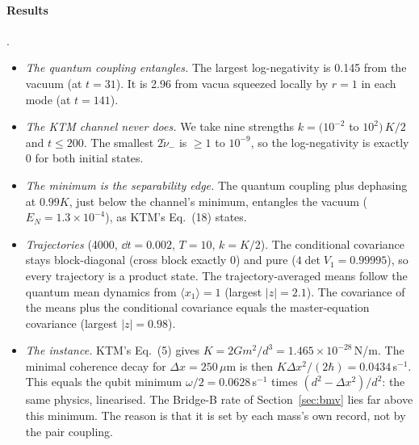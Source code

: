\paragraph{Results} .
\begin{itemize}[nosep]
\item \emph{The quantum coupling entangles.} The largest log-negativity is 0.145 from the vacuum (at $t=31$). It is 2.96 from vacua squeezed
locally by $r=1$ in each mode (at $t=141$).
\item \emph{The KTM channel never does.} We take nine strengths $k=(10^{-2}$ to $10^2)\,K/2$ and $t\le200$. The smallest $2\tilde\nu_-$ is
$\ge1$ to $10^{-9}$, so the log-negativity is exactly 0 for both initial states.
\item \emph{The minimum is the separability edge.} The quantum coupling plus dephasing at $0.99K$, just below the channel's minimum,
entangles the vacuum ($E_N=1.3\times10^{-4}$), as KTM's Eq.~(18) states.
\item \emph{Trajectories} (4000, $\dd t=0.002$, $T=10$, $k=K/2$). The conditional covariance stays block-diagonal (cross block exactly 0)
and pure ($4\det V_1=0.99995$), so every trajectory is a product state. The trajectory-averaged means follow the quantum mean dynamics
from $\langle x_1\rangle=1$ (largest $|z|=2.1$). The covariance of the means plus the conditional covariance equals the master-equation
covariance (largest $|z|=0.98$).
\item \emph{The instance.} KTM's Eq.~(5) gives $K=2Gm^2/d^3=1.465\times10^{-28}$\,N/m. The minimal coherence decay for $\Delta x=250\,\mu$m is
then $K\Delta x^2/(2\hbar)=0.0434$\,s$^{-1}$. This equals the qubit minimum $\omega/2=0.0628$\,s$^{-1}$ times $(d^2-\Delta x^2)/d^2$: the same
physics, linearised. The Bridge-B rate of Section~\ref{sec:bmv} lies far above this minimum. The reason is that it is set by each mass's own
record, not by the pair coupling.
\end{itemize}

